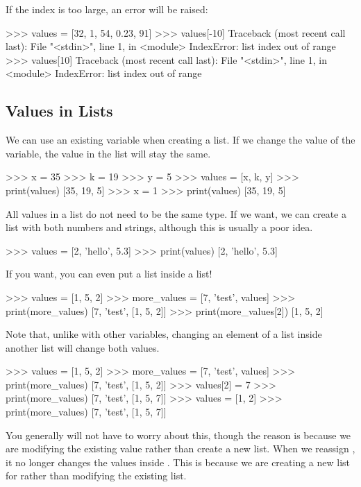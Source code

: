 \documentclass[11pt]{cselabheader}
\begin{document}
If the index is too large, an error will be raised:

\begin{pyconcode}
>>> values = [32, 1, 54, 0.23, 91]
>>> values[-10]
Traceback (most recent call last):
  File "<stdin>", line 1, in <module>
  IndexError: list index out of range
  >>> values[10]
  Traceback (most recent call last):
    File "<stdin>", line 1, in <module>
    IndexError: list index out of range
\end{pyconcode}

\subsection{Values in Lists}
We can use an existing variable when creating a list. If we change the value of
the variable, the value in the list will stay the same.

\begin{pyconcode}
>>> x = 35
>>> k = 19
>>> y = 5
>>> values = [x, k, y]
>>> print(values)
[35, 19, 5]
>>> x = 1
>>> print(values)
[35, 19, 5]
\end{pyconcode}

All values in a list do not need to be the same type. If we want, we can create
a list with both numbers and strings, although this is usually a poor idea.

\begin{pyconcode}
>>> values = [2, 'hello', 5.3]
>>> print(values)
[2, 'hello', 5.3]
\end{pyconcode}

If you want, you can even put a list inside a list!

\begin{pyconcode}
>>> values = [1, 5, 2]
>>> more_values = [7, 'test', values]
>>> print(more_values)
[7, 'test', [1, 5, 2]]
>>> print(more_values[2])
[1, 5, 2]
\end{pyconcode}

Note that, unlike with other variables, changing an element of a list inside
another list will change both values.

\begin{pyconcode}
>>> values = [1, 5, 2]
>>> more_values = [7, 'test', values]
>>> print(more_values)
[7, 'test', [1, 5, 2]]
>>> values[2] = 7
>>> print(more_values)
[7, 'test', [1, 5, 7]]
>>> values = [1, 2]
>>> print(more_values)
[7, 'test', [1, 5, 7]]
\end{pyconcode}

You generally will not have to worry about this, though the reason is because
we are modifying the existing value rather than create a new list. When we
reassign , it no longer changes the values inside
. This is because we are creating a new list for
 rather than modifying the existing list.
\end{document}

